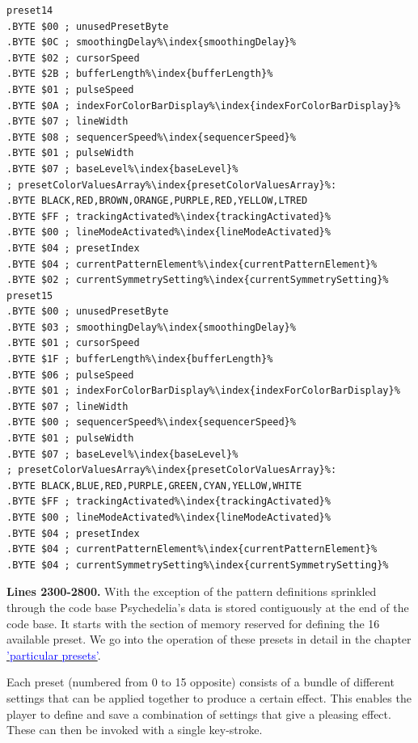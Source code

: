 \begin{minipage}[b]{0.33\linewidth}
\begin{lrbox}{\mybox}
\begin{lstlisting}[basicstyle=\ttfamily\tiny,escapechar=\%]
preset14
.BYTE $00 ; unusedPresetByte
.BYTE $0C ; smoothingDelay%\index{smoothingDelay}%
.BYTE $02 ; cursorSpeed
.BYTE $2B ; bufferLength%\index{bufferLength}%
.BYTE $01 ; pulseSpeed
.BYTE $0A ; indexForColorBarDisplay%\index{indexForColorBarDisplay}%
.BYTE $07 ; lineWidth
.BYTE $08 ; sequencerSpeed%\index{sequencerSpeed}%
.BYTE $01 ; pulseWidth
.BYTE $07 ; baseLevel%\index{baseLevel}%
; presetColorValuesArray%\index{presetColorValuesArray}%: 
.BYTE BLACK,RED,BROWN,ORANGE,PURPLE,RED,YELLOW,LTRED
.BYTE $FF ; trackingActivated%\index{trackingActivated}%
.BYTE $00 ; lineModeActivated%\index{lineModeActivated}%
.BYTE $04 ; presetIndex
.BYTE $04 ; currentPatternElement%\index{currentPatternElement}%
.BYTE $02 ; currentSymmetrySetting%\index{currentSymmetrySetting}%
preset15
.BYTE $00 ; unusedPresetByte
.BYTE $03 ; smoothingDelay%\index{smoothingDelay}%
.BYTE $01 ; cursorSpeed
.BYTE $1F ; bufferLength%\index{bufferLength}%
.BYTE $06 ; pulseSpeed
.BYTE $01 ; indexForColorBarDisplay%\index{indexForColorBarDisplay}%
.BYTE $07 ; lineWidth
.BYTE $00 ; sequencerSpeed%\index{sequencerSpeed}%
.BYTE $01 ; pulseWidth
.BYTE $07 ; baseLevel%\index{baseLevel}%
; presetColorValuesArray%\index{presetColorValuesArray}%: 
.BYTE BLACK,BLUE,RED,PURPLE,GREEN,CYAN,YELLOW,WHITE
.BYTE $FF ; trackingActivated%\index{trackingActivated}%
.BYTE $00 ; lineModeActivated%\index{lineModeActivated}%
.BYTE $04 ; presetIndex
.BYTE $04 ; currentPatternElement%\index{currentPatternElement}%
.BYTE $04 ; currentSymmetrySetting%\index{currentSymmetrySetting}%

\end{lstlisting}
\end{lrbox}%
\scalebox{0.8}{\usebox{\mybox}}
\end{minipage}
\clearpage
{}
\textbf{Lines 2300-2800.} With the exception of the pattern definitions sprinkled through the code base Psychedelia's
data is stored contiguously at the end of the code base. It starts with the section of memory reserved for defining
the 16 available preset. We go into the operation of these presets in detail in the chapter
\hyperref[sec:presets]{\textcolor{blue}{'particular presets'}}.

Each preset (numbered from 0 to 15 opposite) consists of a bundle of different settings that can be applied together
to produce a certain effect. This enables the player to define and save a combination of settings that give a pleasing
effect. These can then be invoked with a single key-stroke.

